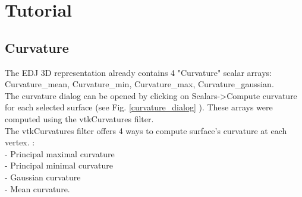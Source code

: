 \documentclass[12pt, a4paper]{book}
\begin{document}
\section{Tutorial}

\subsection{Curvature}
The EDJ 3D representation already contains 4 "Curvature" scalar arrays: Curvature\_mean, Curvature\_min, Curvature\_max, Curvature\_gaussian.\\ 
The curvature dialog can be opened by clicking on Scalars->Compute curvature for each selected surface (see Fig. \ref{curvature_dialog} \pageref{curvature_dialog}). These arrays were computed using the vtkCurvatures filter.\\
The vtkCurvatures filter offers 4 ways to compute surface's
curvature at each vertex. :\\
- Principal maximal curvature\\
- Principal minimal curvature\\
- Gaussian curvature\\
- Mean curvature.\\
\end{document}
